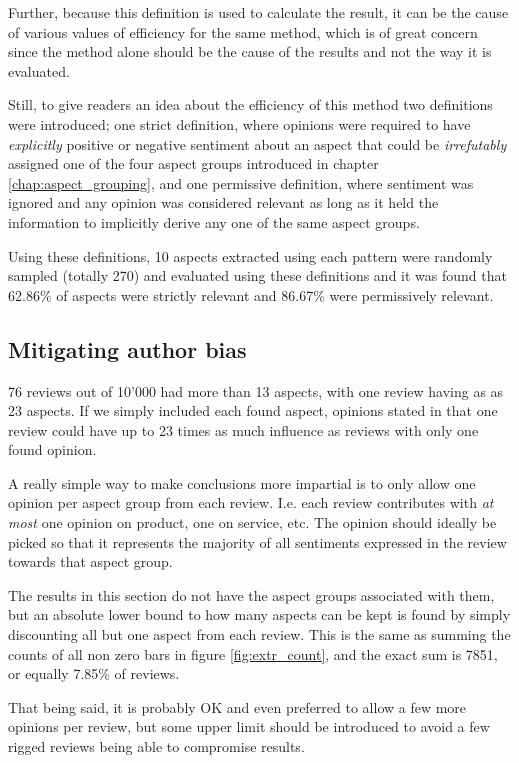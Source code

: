 \documentclass[a4paper,11pt]{kth-mag}
\begin{document}
Further, because this definition is used to calculate the result, it can be the cause of
various values of efficiency for the same method, which is of great concern
since the method alone should be the cause of the results and not the way it is evaluated.

Still, to give readers an idea about the efficiency of this method two definitions
were introduced; one strict definition, where opinions were required to have
\emph{explicitly} positive or negative sentiment about an aspect that could be
\emph{irrefutably} assigned one of the four aspect groups introduced in chapter \ref{chap:aspect_grouping},
and one permissive definition, where sentiment was ignored and any opinion was considered
relevant as long as it held the information to implicitly derive any one of the same aspect groups.

Using these definitions, 10 aspects extracted using each pattern were randomly sampled (totally 270)
and evaluated using these definitions  and it was found that 62.86\% of aspects were strictly relevant
and 86.67\% were permissively relevant.


\subsection{Mitigating author bias}
76 reviews out of 10'000 had more than 13 aspects, with one review having as  as 23 aspects.
If we simply included each found aspect, opinions stated in that one review could have up to
23 times as much influence as reviews with only one found opinion.

A really simple way to make conclusions more impartial is to only allow one
opinion per aspect group from each review.
I.e. each review contributes with \emph{at most} one opinion on product, one on service, etc.
The opinion should ideally be picked so that it represents the majority of
all sentiments expressed in the review towards that aspect group.

The results in this section do not have the aspect groups associated with them,
but an absolute lower bound to how many aspects can be kept
is found by simply discounting all but one aspect from each review. This is the same
as summing the counts of all non zero bars in figure \ref{fig:extr_count}, and the
exact sum is 7851, or equally 7.85\% of reviews.

That being said, it is probably OK and even preferred to allow a few more opinions per review,
but some upper limit should be introduced to avoid a few rigged reviews being able to compromise results.
\end{document}
